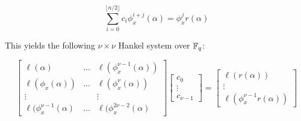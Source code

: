 

\begin{equation*}
    \sum_{i=0}^{\lfloor n/2 \rfloor} c_i\phi_{x}^{i +j}(\alpha) = \phi_x^jr(\alpha)
\end{equation*}

This yields the following $\nu \times \nu$ Hankel system over $\mathbb{F}_q$:

\begin{equation*}
    \begin{bmatrix}
    \ell(\alpha) & \ldots & \ell(\phi_x^{\nu - 1}(\alpha)) \\
    \ell(\phi_x(\alpha)) & \ldots & \ell(\phi_x^{\nu}(\alpha)) \\
    \vdots & & \vdots \\
    \ell(\phi_x^{\nu - 1}(\alpha) & \ldots & \ell(\phi_x^{2\nu - 2}(\alpha)
    \end{bmatrix}
    \begin{bmatrix}c_0 \\ \vdots \\ c_{\nu - 1} \end{bmatrix} = 
    \begin{bmatrix} \ell (r(\alpha)) \\ \vdots \\ \ell(\phi_x^{\nu - 1}r(\alpha)) \end{bmatrix}
\end{equation*}

